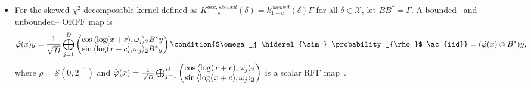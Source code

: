 \begin{itemize}
    \item For the skewed-$\chi^2$ decomposable kernel defined as
    $K_{1-c}^{dec,skewed}(\delta)=k_{1-c}^{skewed}(\delta)\Gamma$ for all
    $\delta\in\mathcal{X}$, let $BB^*=\Gamma$. A bounded --and unbounded--
    \acs{ORFF} map is
    \begin{dmath*}
        \tildePhi{\omega}(x)y
        =\frac{1}{\sqrt{D}}\Vect_{j=1}^D
        \begin{pmatrix}
            \cos{\inner{\log(x+c),\omega_j}_2}B^\adjoint y \\
            \sin{\inner{\log(x+c),\omega_j}_2}B^\adjoint y
        \end{pmatrix}
        \condition{$\omega_j \hiderel{\sim} \probability_{\rho}$ \ac{iid}}
        =(\tildePhi{\omega}(x) \otimes B^\adjoint)y,
    \end{dmath*}
    where $\rho=\mathcal{S}(0,2^{-1})$ and $\tildePhi{\omega}(x) =
    \frac{1}{\sqrt{D}} \Vect_{j=1}^D
    \begin{pmatrix}
        \cos{\inner{\log(x+c),\omega_j}_2} \\
        \sin{\inner{\log(x+c),\omega_j}_2}
    \end{pmatrix}$ is a scalar \acs{RFF} map~\citep{li2010random}.
\end{itemize}

